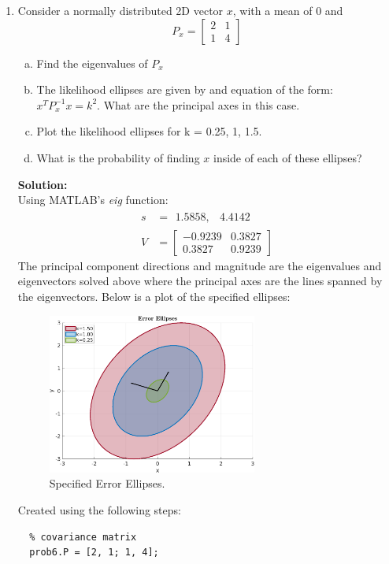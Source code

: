 \documentclass[11pt]{article}
\newcommand{\solution}{\textbf{Solution: \\}}
\begin{document}
\begin{enumerate}[label=\textbf{\arabic*.}]
  \item Consider a normally distributed 2D vector $x$, with a mean of 0 and 
  \begin{equation*}
    P_x = 
    \begin{bmatrix}
      2 & 1 \\ 1 & 4
    \end{bmatrix}
  \end{equation*}
  \begin{enumerate}[(a)]
    \itemsep -2pt
    \item Find the eigenvalues of $P_x$
    \item The likelihood ellipses are given by and equation of the form: 
    $x^TP_x^{-1}x=k^2$. What are the principal axes in this case.
    \item Plot the likelihood ellipses for k = 0.25, 1, 1.5.
    \item What is the probability of finding $x$ inside of each of these ellipses?
  \end{enumerate}
  \solution
  Using MATLAB's \emph{eig} function:
  \begin{equation*}
    \begin{split}
      s &= \begin{matrix} 1.5858, & 4.4142 \end{matrix} \\
      V &= \begin{bmatrix} -0.9239 & 0.3827 \\ 0.3827 & 0.9239 \end{bmatrix}
    \end{split}
  \end{equation*}
  The principal component directions and magnitude are the eigenvalues and 
  eigenvectors solved above where the principal axes are the lines spanned by 
  the eigenvectors. Below is a plot of the specified ellipses:
  \begin{figure}[H]
    \centering
    \includegraphics[width=0.65\textwidth]{p6.png}
    \caption{Specified Error Ellipses.}
  \end{figure}
  Created using the following steps:
  \begin{lstlisting}
  % covariance matrix
  prob6.P = [2, 1; 1, 4];


\end{lstlisting}
\end{enumerate}
\end{document}
